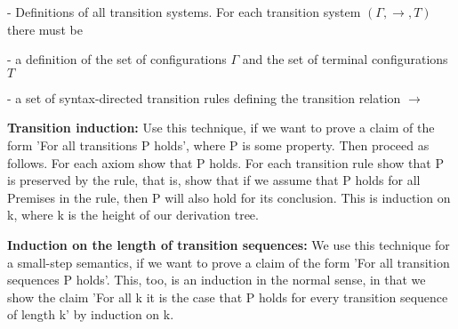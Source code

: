 \documentclass[10pt]{article}
\begin{document}
\quad \quad - Definitions of all transition systems. For each transition system $(\Gamma, \rightarrow,T)$ there must be

\quad \quad \quad - a definition of the set of configurations $\Gamma$ and the set of terminal configurations $T$

\quad \quad \quad - a set of syntax-directed transition rules defining the transition relation $\rightarrow$

\textbf{Transition induction:} Use this technique, if we want to prove a claim of the form 'For all transitions P holds', where P is some property. Then proceed as follows. For each axiom show that P holds. For each transition rule show that P is preserved by the rule, that is, show that if we assume that P holds for all Premises in the rule, then P will also hold for its conclusion. This is induction on k, where k is the height of our derivation tree.

\textbf{Induction on the length of transition sequences:} We use this technique for a small-step semantics, if we want to prove a claim of the form 'For all transition sequences P holds'. This, too, is an induction in the normal sense, in that we show the claim 'For all k it is the case that P holds for every transition sequence of length k' by induction on k.
\end{document}
